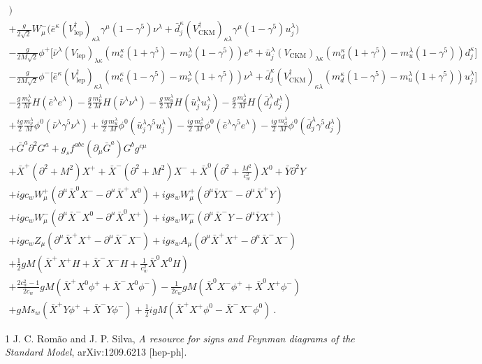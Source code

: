 \documentclass{article}
\begin{document}
\begin{multline*}
\Big) \\
+ \frac{g}{2 \sqrt{2}} W_\mu^- \Big( 
\bar{e}^\kappa (V_{\text{lep}}^\dagger)_{\kappa\lambda} \gamma^\mu (1 - \gamma^5) \nu^\lambda 
+ \bar{d}_j^\kappa (V_{\text{CKM}}^\dagger)_{\kappa\lambda} \gamma^\mu (1 - \gamma^5) u_j^\lambda 
\Big) \\
- \frac{g}{2 M \sqrt{2}} \phi^+ \Big[ 
\bar{\nu}^\lambda (V_{\text{lep}})_{\lambda\kappa} \left( m_e^\kappa (1 + \gamma^5) - m_\nu^\lambda (1 - \gamma^5) \right) e^\kappa 
+ \bar{u}_j^\lambda (V_{\text{CKM}})_{\lambda\kappa} \left( m_d^\kappa (1 + \gamma^5) - m_u^\lambda (1 - \gamma^5) \right) d_j^\kappa 
\Big] \\
- \frac{g}{2 M \sqrt{2}} \phi^- \Big[ 
\bar{e}^\kappa (V_{\text{lep}}^\dagger)_{\kappa\lambda} \left( m_e^\kappa (1 - \gamma^5) - m_\nu^\lambda (1 + \gamma^5) \right) \nu^\lambda 
+ \bar{d}_j^\kappa (V_{\text{CKM}}^\dagger)_{\kappa\lambda} \left( m_d^\kappa (1 - \gamma^5) - m_u^\lambda (1 + \gamma^5) \right) u_j^\lambda 
\Big] \\
- \frac{g}{2} \frac{m_e^\lambda}{M} H (\bar{e}^\lambda e^\lambda) 
- \frac{g}{2} \frac{m_\nu^\lambda}{M} H (\bar{\nu}^\lambda \nu^\lambda) 
- \frac{g}{2} \frac{m_u^\lambda}{M} H (\bar{u}_j^\lambda u_j^\lambda) 
- \frac{g}{2} \frac{m_d^\lambda}{M} H (\bar{d}_j^\lambda d_j^\lambda) \\
+ \frac{i g}{2} \frac{m_\nu^\lambda}{M} \phi^0 (\bar{\nu}^\lambda \gamma^5 \nu^\lambda) 
+ \frac{i g}{2} \frac{m_u^\lambda}{M} \phi^0 (\bar{u}_j^\lambda \gamma^5 u_j^\lambda) 
- \frac{i g}{2} \frac{m_e^\lambda}{M} \phi^0 (\bar{e}^\lambda \gamma^5 e^\lambda) 
- \frac{i g}{2} \frac{m_d^\lambda}{M} \phi^0 (\bar{d}_j^\lambda \gamma^5 d_j^\lambda) \\
+ \bar{G}^a \partial^2 G^a 
+ g_s f^{abc} (\partial_\mu \bar{G}^a) G^b g^{c\mu} \\
+ \bar{X}^+ (\partial^2 + M^2) X^+ 
+ \bar{X}^- (\partial^2 + M^2) X^- 
+ \bar{X}^0 \left( \partial^2 + \frac{M^2}{c_w^2} \right) X^0 
+ \bar{Y} \partial^2 Y \\
+ i g c_w W_\mu^+ (\partial^\mu \bar{X}^0 X^- - \partial^\mu \bar{X}^+ X^0) 
+ i g s_w W_\mu^+ (\partial^\mu \bar{Y} X^- - \partial^\mu \bar{X}^+ Y) \\
+ i g c_w W_\mu^- (\partial^\mu \bar{X}^- X^0 - \partial^\mu \bar{X}^0 X^+) 
+ i g s_w W_\mu^- (\partial^\mu \bar{X}^- Y - \partial^\mu \bar{Y} X^+) \\
+ i g c_w Z_\mu (\partial^\mu \bar{X}^+ X^+ - \partial^\mu \bar{X}^- X^-) 
+ i g s_w A_\mu (\partial^\mu \bar{X}^+ X^+ - \partial^\mu \bar{X}^- X^-) \\
+ \frac{1}{2} g M \left( \bar{X}^+ X^+ H + \bar{X}^- X^- H + \frac{1}{c_w^2} \bar{X}^0 X^0 H \right) \\
+ \frac{2 c_w^2 - 1}{2 c_w} g M (\bar{X}^+ X^0 \phi^+ + \bar{X}^- X^0 \phi^-) 
- \frac{1}{2 c_w} g M (\bar{X}^0 X^- \phi^+ + \bar{X}^0 X^+ \phi^-) \\
+ g M s_w (\bar{X}^+ Y \phi^+ + \bar{X}^- Y \phi^-) 
+ \frac{1}{2} i g M (\bar{X}^+ X^+ \phi^0 - \bar{X}^- X^- \phi^0) \ .
\end{multline*}

\begin{thebibliography}{1}
J. C. Romão and J. P. Silva,
\textit{A resource for signs and Feynman diagrams of the Standard Model},
arXiv:1209.6213 [hep-ph].
\end{thebibliography}
\end{document}
